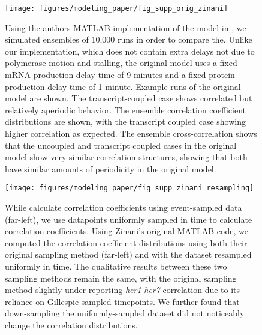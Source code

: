 \documentclass[11pt]{article}
\begin{document}
\begin{figure}[hbtp]
    \centering
    {\texttt{[image: figures/modeling\_paper/fig\_supp\_orig\_zinani]}
    \label{fig:supp:zinani_matlab_mRNA}
    \label{fig:supp:zinani_matlab_correlation}
    \label{fig:supp:zinani_matlab_cross_correlation} %
    }
    \caption{Using the authors MATLAB implementation of the model in \textcite{zinaniPairingSegmentationClock2021}, we simulated ensembles of 10,000 runs in order to compare the. Unlike our implementation, which does not contain extra delays not due to polymerase motion and stalling, the original model uses a fixed mRNA production delay time of 9 minutes and a fixed protein production delay time of 1 minute.
         Example runs of the original model are shown. The transcript-coupled case shows correlated but relatively aperiodic behavior.
         The ensemble correlation coefficient distributions are shown, with the transcript coupled case showing higher correlation as expected.
         The ensemble cross-correlation shows that the uncoupled and transcript coupled cases in the original model show very similar correlation structures, showing that both have similar amounts of periodicity in the original model.
    }
    \label{fig:top:zinani_matlab}
\end{figure}

\begin{figure}[hbtp]
    \centering
    {\texttt{[image: figures/modeling\_paper/fig\_supp\_zinani\_resampling]}
    }
    \caption{While \textcite{zinaniPairingSegmentationClock2021} calculate correlation coefficients using event-sampled data (far-left), we use datapoints uniformly sampled in time to calculate correlation coefficients. Using Zinani's original MATLAB code, we computed the correlation coefficient distributions using both their original sampling method (far-left) and with the dataset resampled uniformly in time. The qualitative results between these two sampling methods remain the same, with the original sampling method slightly under-reporting \textit{her1}-\textit{her7} correlation due to its reliance on Gillespie-sampled timepoints. We further found that down-sampling the uniformly-sampled dataset did not noticeably change the correlation distributions.
    }
    \label{fig:top:supp_zinani_sampling}
\end{figure}
\end{document}
